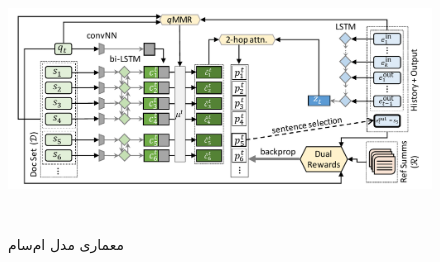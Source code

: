     \begin{figure}[!h]
	\begin{center}
		\includegraphics[height=7cm]{query-assited.png}
	\end{center}
	\caption{ معماری مدل  ام‌سام \cite{shapira-etal-2022-interactive}} 
	\label{fig:MSumm}
	
	\medskip
	
\end{figure}






